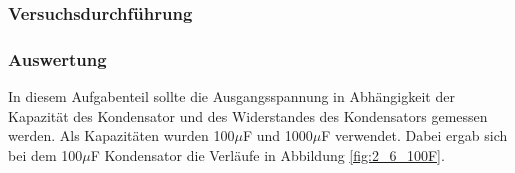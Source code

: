 \documentclass[12pt,a4paper]{article}
\begin{document}
\subsubsection{Versuchsdurchführung}

\subsubsection{Auswertung}
In diesem Aufgabenteil sollte die Ausgangsspannung in Abhängigkeit der Kapazität des Kondensator und des Widerstandes des Kondensators gemessen werden. Als Kapazitäten wurden 100$\mu$F und 1000$\mu$F verwendet. Dabei ergab sich bei dem 100$\mu$F Kondensator die Verläufe in Abbildung \ref{fig:2_6_100F}.
\end{document}
